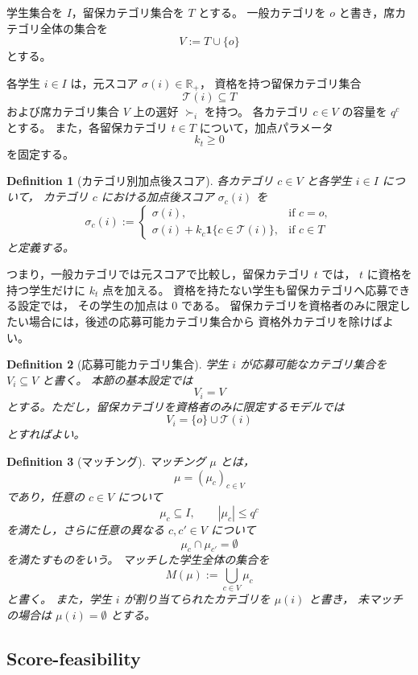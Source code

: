 \documentclass[
  12pt,
  a4paper,
  oneside,
  onecolumn,
  titlepage,
  final
]{jsarticle}
\newtheorem{definition}{Definition}
\newcommand{\1}{\mathbf{1}}
\begin{document}
学生集合を $I$，留保カテゴリ集合を $T$ とする。
一般カテゴリを $o$ と書き，席カテゴリ全体の集合を
\[
    V:=T\cup\{o\}
\]
とする。

各学生 $i\in I$ は，元スコア $\sigma(i)\in\mathbb R_+$，
資格を持つ留保カテゴリ集合
\[
    \mathcal T(i)\subseteq T
\]
および席カテゴリ集合 $V$ 上の選好 $\succ_i$ を持つ。
各カテゴリ $c\in V$ の容量を $q^c$ とする。
また，各留保カテゴリ $t\in T$ について，加点パラメータ
\[
    k_t\geq 0
\]
を固定する。

\begin{definition}[カテゴリ別加点後スコア]
\label{def:category-adjusted-score}
各カテゴリ $c\in V$ と各学生 $i\in I$ について，
カテゴリ $c$ における加点後スコア $\sigma_c(i)$ を
\[
    \sigma_c(i)
    :=
    \begin{cases}
        \sigma(i), & \text{if } c=o, \\[4pt]
        \sigma(i)+k_c\mathbf 1\{c\in\mathcal T(i)\}, & \text{if } c\in T
    \end{cases}
\]
と定義する。
\end{definition}

\noindent
つまり，一般カテゴリでは元スコアで比較し，留保カテゴリ $t$ では，
$t$ に資格を持つ学生だけに $k_t$ 点を加える。
資格を持たない学生も留保カテゴリへ応募できる設定では，
その学生の加点は $0$ である。
留保カテゴリを資格者のみに限定したい場合には，後述の応募可能カテゴリ集合から
資格外カテゴリを除けばよい。

\begin{definition}[応募可能カテゴリ集合]
\label{def:acceptable-categories}
学生 $i$ が応募可能なカテゴリ集合を $V_i\subseteq V$ と書く。
本節の基本設定では
\[
    V_i=V
\]
とする。ただし，留保カテゴリを資格者のみに限定するモデルでは
\[
    V_i=\{o\}\cup\mathcal T(i)
\]
とすればよい。
\end{definition}

\begin{definition}[マッチング]
\label{def:matching-score-elevated}
マッチング $\mu$ とは，
\[
    \mu=(\mu_c)_{c\in V}
\]
であり，任意の $c\in V$ について
\[
    \mu_c\subseteq I,\qquad |\mu_c|\leq q^c
\]
を満たし，さらに任意の異なる $c,c'\in V$ について
\[
    \mu_c\cap\mu_{c'}=\emptyset
\]
を満たすものをいう。
マッチした学生全体の集合を
\[
    M(\mu):=\bigcup_{c\in V}\mu_c
\]
と書く。
また，学生 $i$ が割り当てられたカテゴリを $\mu(i)$ と書き，
未マッチの場合は $\mu(i)=\emptyset$ とする。
\end{definition}

\subsection{Score-feasibility}
\end{document}
